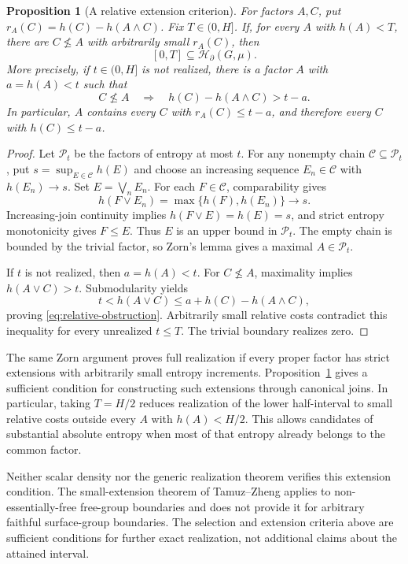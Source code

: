 \documentclass[11pt,letterpaper]{amsart}
\newtheorem{proposition}[theorem]{Proposition}
\theoremstyle{definition}
\theoremstyle{remark}
\numberwithin{equation}{section}
\newcommand{\HH}{\mathscr H_{\partial}}
\begin{document}
\begin{proposition}[A relative extension criterion]\label{prop:relative-extension}
For factors $A,C$, put $r_A(C)=h(C)-h(A\wedge C)$.
Fix $T\in(0,H]$. If, for every $A$ with $h(A)<T$, there are
$C\not\le A$ with arbitrarily small $r_A(C)$, then
\[
 [0,T]\subseteq\HH(G,\mu).
\]
More precisely, if $t\in(0,H]$ is not realized, there is a factor
$A$ with $a=h(A)<t$ such that
\begin{equation}\label{eq:relative-obstruction}
 C\not\le A\quad\Longrightarrow\quad
 h(C)-h(A\wedge C)>t-a.
\end{equation}
In particular, $A$ contains every $C$ with $r_A(C)\le t-a$,
and therefore every $C$ with $h(C)\le t-a$.
\end{proposition}
\begin{proof}
Let $\mathcal P_t$ be the factors of entropy at most $t$. For any
nonempty chain $\mathcal C\subseteq\mathcal P_t$, put
$s=\sup_{E\in\mathcal C}h(E)$ and choose an increasing sequence
$E_n\in\mathcal C$ with $h(E_n)\to s$. Set $E=\bigvee_n E_n$.
For each $F\in\mathcal C$, comparability gives
\[
 h(F\vee E_n)=\max\{h(F),h(E_n)\}\longrightarrow s.
\]
Increasing-join continuity implies $h(F\vee E)=h(E)=s$, and
strict entropy monotonicity gives $F\le E$. Thus $E$ is an upper
bound in $\mathcal P_t$. The empty chain is bounded by the trivial
factor, so Zorn's lemma gives a maximal $A\in\mathcal P_t$.

If $t$ is not realized, then $a=h(A)<t$. For $C\not\le A$,
maximality implies $h(A\vee C)>t$. Submodularity yields
\[
 t<h(A\vee C)\le a+h(C)-h(A\wedge C),
\]
proving \eqref{eq:relative-obstruction}. Arbitrarily small relative
costs contradict this inequality for every unrealized $t\le T$.
The trivial boundary realizes zero.
\end{proof}

The same Zorn argument proves full realization if every proper factor
has strict extensions with arbitrarily small entropy increments.
Proposition~\ref{prop:relative-extension} gives a sufficient condition
for constructing such extensions through canonical joins. In particular,
taking $T=H/2$ reduces realization of the lower half-interval to small
relative costs outside every $A$ with $h(A)<H/2$. This allows candidates
of substantial absolute entropy when most of that entropy already
belongs to the common factor.

Neither scalar density nor the generic realization theorem verifies
this extension condition. The small-extension theorem of
Tamuz--Zheng \cite[Theorem 1.3]{TZ} applies to non-essentially-free
free-group boundaries and does not provide it for arbitrary faithful
surface-group boundaries. The selection and extension criteria above
are sufficient conditions for further exact realization, not additional
claims about the attained interval.
\end{document}
